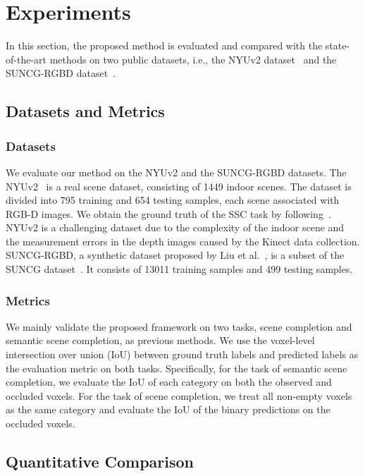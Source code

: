 \documentclass[letterpaper]{article} \usepackage{aaai20}  \usepackage{times}  \usepackage{helvet} \usepackage{courier}  \usepackage[hyphens]{url}  \usepackage{graphicx} \urlstyle{rm} \def\UrlFont{\rm}  \usepackage{graphicx}  \frenchspacing  \setlength{\pdfpagewidth}{8.5in}  \setlength{\pdfpageheight}{11in}
\begin{document}
\section{Experiments}
In this section, the proposed method is evaluated and compared with the state-of-the-art methods on two public datasets, i.e., the NYUv2 dataset~\cite{Silberman2012IndoorSA} and the SUNCG-RGBD dataset~\cite{Liu2018SeeAT}.

\subsection{Datasets and Metrics}
\subsubsection{Datasets}
We evaluate our method on the NYUv2 and the SUNCG-RGBD datasets. The NYUv2~\cite{Silberman2012IndoorSA} is a real scene dataset, consisting of 1449 indoor scenes. The dataset is divided into 795 training and 654 testing samples, each scene associated with RGB-D images. We obtain the ground truth of the SSC task by following~\cite{Song2016SemanticSC}. NYUv2 is a challenging dataset due to the complexity of the indoor scene and the measurement errors in the depth images caused by the Kinect data collection. SUNCG-RGBD, a synthetic dataset proposed by Liu et al.~\cite{Liu2018SeeAT}, is a subset of the SUNCG dataset~\cite{Song2016SemanticSC}. It consists of 13011 training samples and 499 testing samples. 
\subsubsection{Metrics}
We mainly validate the proposed framework on two tasks, scene completion and semantic scene completion, as previous methods. We use the voxel-level intersection over union (IoU) between ground truth labels and predicted labels as the evaluation metric on both tasks. Specifically, for the task of semantic scene completion, we evaluate the IoU of each category on both the observed and occluded voxels. For the task of scene completion, we treat all non-empty voxels as the same category and evaluate the IoU of the binary predictions on the occluded voxels.

\subsection{Quantitative Comparison}
\end{document}
